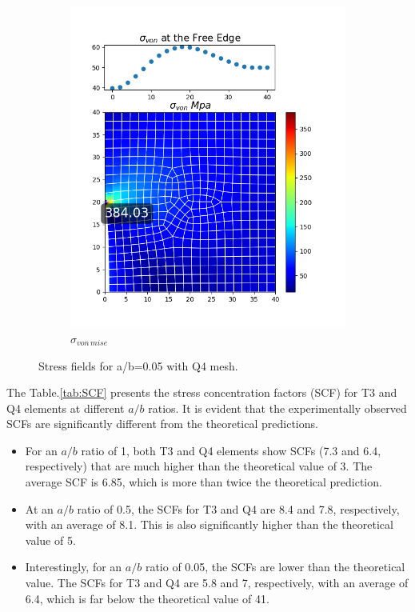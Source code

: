 \documentclass[twoside,twocolumn,10pt]{article}
\begin{document}
\begin{figure}[!ht]
\begin{subfigure}[c]{0.26\textwidth}
    \includegraphics[width=1.\linewidth]{Q2_5/Q5_0.05_von_quad.png}
    \caption{$\sigma_{von \, mise}$}
    \label{fig:von_quad_0.05}
  \end{subfigure}
  \caption{Stress fields for a/b=0.05 with Q4 mesh.}
  \label{fig:quad_0.05}
\end{figure}

The Table.\ref{tab:SCF} presents the stress concentration factors (SCF) for T3 and Q4 elements at different \(a/b\) ratios. It is evident that the experimentally observed SCFs are significantly different from the theoretical predictions.

\begin{itemize}
    \item For an \(a/b\) ratio of 1, both T3 and Q4 elements show SCFs (7.3 and 6.4, respectively) that are much higher than the theoretical value of 3. The average SCF is 6.85, which is more than twice the theoretical prediction.
    \item At an \(a/b\) ratio of 0.5, the SCFs for T3 and Q4 are 8.4 and 7.8, respectively, with an average of 8.1. This is also significantly higher than the theoretical value of 5.
    \item Interestingly, for an \(a/b\) ratio of 0.05, the SCFs are lower than the theoretical value. The SCFs for T3 and Q4 are 5.8 and 7, respectively, with an average of 6.4, which is far below the theoretical value of 41.
\end{itemize}
\end{document}
